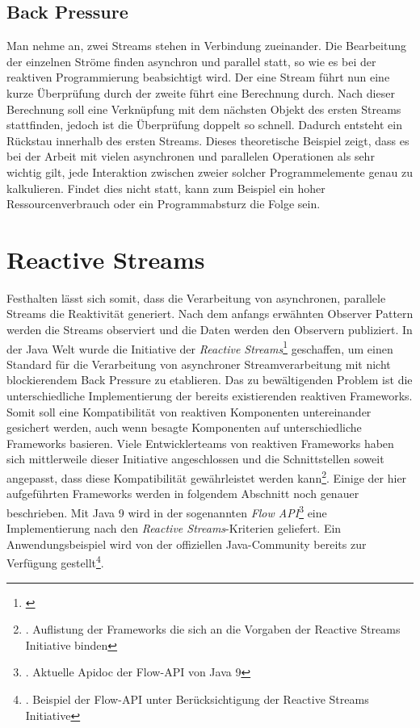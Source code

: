 \subsection{Back Pressure}
Man nehme an, zwei Streams stehen in Verbindung zueinander. Die Bearbeitung der einzelnen Ströme finden asynchron und parallel statt, so wie es bei der reaktiven Programmierung beabsichtigt wird. Der eine Stream führt nun eine kurze Überprüfung durch der zweite führt eine Berechnung durch. Nach dieser Berechnung soll eine Verknüpfung mit dem nächsten Objekt des ersten Streams stattfinden, jedoch ist die Überprüfung doppelt so schnell. Dadurch entsteht ein Rückstau innerhalb des ersten Streams. Dieses theoretische Beispiel zeigt, dass es bei der Arbeit mit vielen asynchronen und parallelen Operationen als sehr wichtig gilt, jede Interaktion zwischen zweier solcher Programmelemente genau zu kalkulieren. Findet dies nicht statt, kann zum Beispiel ein hoher Ressourcenverbrauch oder ein Programmabsturz die Folge sein.
\section{Reactive Streams}
Festhalten lässt sich somit, dass die Verarbeitung von asynchronen, parallele Streams die Reaktivität generiert. Nach dem anfangs erwähnten Observer Pattern werden die Streams observiert und die Daten werden den Observern publiziert. In der Java Welt wurde die Initiative der \textit{Reactive Streams}\footnote{\cite{reactivestreams}} geschaffen, um einen Standard für die Verarbeitung von asynchroner Streamverarbeitung mit nicht blockierendem Back Pressure zu etablieren. Das zu bewältigenden Problem ist die unterschiedliche Implementierung der bereits existierenden reaktiven Frameworks. Somit soll eine Kompatibilität von reaktiven Komponenten untereinander gesichert werden, auch wenn besagte Komponenten auf unterschiedliche Frameworks basieren. Viele Entwicklerteams von reaktiven Frameworks haben sich mittlerweile dieser Initiative angeschlossen und die Schnittstellen soweit angepasst, dass diese Kompatibilität gewährleistet werden kann\footnote{\cite{rs.implementations}. Auflistung der Frameworks die sich an die Vorgaben der Reactive Streams Initiative binden}. Einige der hier aufgeführten Frameworks werden in folgendem Abschnitt noch genauer beschrieben. Mit Java 9 wird in der sogenannten \textit{Flow API}\footnote{\cite{fl.apidoc}. Aktuelle Apidoc der Flow-API von Java 9} eine Implementierung nach den \textit{Reactive Streams}-Kriterien geliefert. Ein Anwendungsbeispiel wird von der offiziellen Java-Community bereits zur Verfügung gestellt\footnote{\cite{flowex}. Beispiel der Flow-API unter Berücksichtigung der Reactive Streams Initiative}.  
